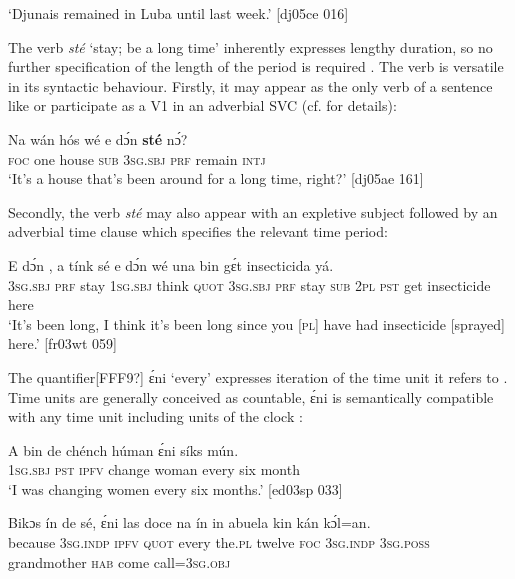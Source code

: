 \glt ‘Djunais remained in Luba until last week.’ [dj05ce 016]
\z

The verb \textit{sté} ‘stay; be a long time’ inherently expresses lengthy duration, so no further specification of the length of the period is required . The verb is versatile in its syntactic behaviour. Firstly, it may appear as the only verb of a sentence like  or participate as a V1 in an adverbial SVC (cf.  for details):


\ea%
    \label{ex:key:1035}
    \gll Na  wán  hós    wé  e    dɔ́n  \textbf{sté}    nɔ́?\\
\textsc{foc}  one  house  \textsc{sub}  \textsc{3sg.sbj}  \textsc{prf}  remain  \textsc{intj}\\

\glt ‘It’s a house that’s been around for a long time, right?’ [dj05ae 161]
\z

Secondly, the verb \textit{sté} may also appear with an expletive subject followed by an adverbial time clause which specifies the relevant time period:


\ea%
    \label{ex:key:1036}
    \gll E    dɔ́n  ,  a    tínk    sé    e    dɔ́n  
wé  una  bin  gɛ́t  insecticida  yá.\\
\textsc{3sg.sbj}  \textsc{prf}  stay  \textsc{1sg.sbj}  think  \textsc{quot}    \textsc{3sg.sbj}  \textsc{prf}  stay
\textsc{sub}  \textsc{2pl}  \textsc{pst}  get  insecticide  here\\

\glt ‘It’s been long, I think it’s been long since you [\textsc{pl}] have had insecticide 
[sprayed] here.’ [fr03wt 059]
\z

The quantifier[FFF9?] ɛ́ni ‘every’ expresses iteration of the time unit it refers to . Time units are generally conceived as countable, ɛ́ni is semantically compatible with any time unit including units of the clock :


\ea%
    \label{ex:key:1037}
    \gll A    bin  de  chénch  húman  ɛ́ni    síks  mún.\\
\textsc{1sg.sbj}  \textsc{pst}  \textsc{ipfv}  change  woman  every  six  month\\

\glt ‘I was changing women every six months.’ [ed03sp 033]
\z


\ea%
    \label{ex:key:1038}
    \gll Bikɔs  ín    de  sé,    ɛ́ni    las    doce  na  ín
in    abuela    kin  kán    kɔ́l=an.\\
because  \textsc{3sg.indp}  \textsc{ipfv}  \textsc{quot}    every  the.\textsc{pl}  twelve  \textsc{foc}  \textsc{3sg.indp}
\textsc{3sg.poss}  grandmother  \textsc{hab}  come  call=\textsc{3sg.obj}\\


